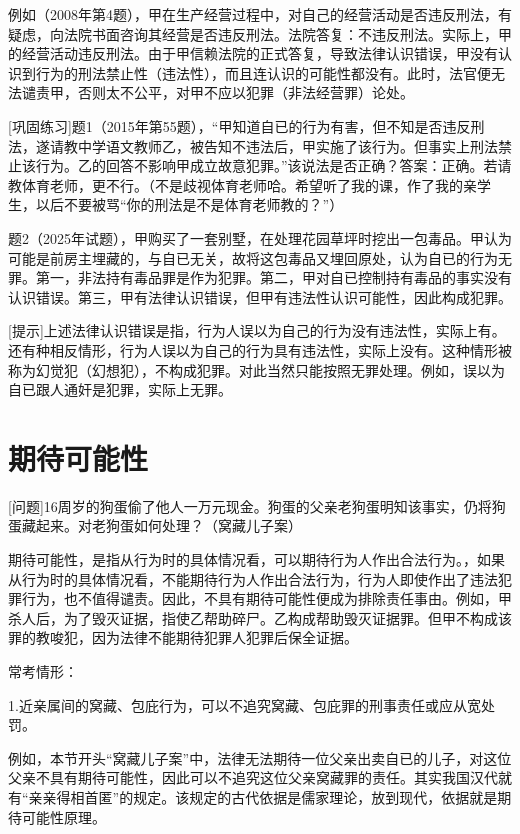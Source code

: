 例如（2008年第4题），甲在生产经营过程中，对自己的经营活动是否违反刑法，有疑虑，向法院书面咨询其经营是否违反刑法。法院答复：不违反刑法。实际上，甲的经营活动违反刑法。由于甲信赖法院的正式答复，导致法律认识错误，甲没有认识到行为的刑法禁止性（违法性），而且连认识的可能性都没有。此时，法官便无法谴责甲，否则太不公平，对甲不应以犯罪（非法经营罪）论处。

[巩固练习]题1（2015年第55题），“甲知道自已的行为有害，但不知是否违反刑法，遂请教中学语文教师乙，被告知不违法后，甲实施了该行为。但事实上刑法禁止该行为。乙的回答不影响甲成立故意犯罪。”该说法是否正确？答案：正确。若请教体育老师，更不行。（不是歧视体育老师哈。希望听了我的课，作了我的亲学生，以后不要被骂“你的刑法是不是体育老师教的？”）

题2（2025年试题），甲购买了一套别墅，在处理花园草坪时挖出一包毒品。甲认为可能是前房主埋藏的，与自已无关，故将这包毒品又埋回原处，认为自已的行为无罪。第一，非法持有毒品罪是作为犯罪。第二，甲对自已控制持有毒品的事实没有认识错误。第三，甲有法律认识错误，但甲有违法性认识可能性，因此构成犯罪。

[提示]上述法律认识错误是指，行为人误以为自己的行为没有违法性，实际上有。还有种相反情形，行为人误以为自己的行为具有违法性，实际上没有。这种情形被称为幻觉犯（幻想犯），不构成犯罪。对此当然只能按照无罪处理。例如，误以为自已跟人通奸是犯罪，实际上无罪。



\section{期待可能性}

[问题]16周岁的狗蛋偷了他人一万元现金。狗蛋的父亲老狗蛋明知该事实，仍将狗蛋藏起来。对老狗蛋如何处理？（窝藏儿子案）

期待可能性，是指从行为时的具体情况看，可以期待行为人作出合法行为。，如果从行为时的具体情况看，不能期待行为人作出合法行为，行为人即使作出了违法犯罪行为，也不值得谴责。因此，不具有期待可能性便成为排除责任事由。例如，甲杀人后，为了毁灭证据，指使乙帮助碎尸。乙构成帮助毁灭证据罪。但甲不构成该罪的教唆犯，因为法律不能期待犯罪人犯罪后保全证据。

常考情形：

1.近亲属间的窝藏、包庇行为，可以不追究窝藏、包庇罪的刑事责任或应从宽处罚。

例如，本节开头“窝藏儿子案”中，法律无法期待一位父亲出卖自已的儿子，对这位父亲不具有期待可能性，因此可以不追究这位父亲窝藏罪的责任。其实我国汉代就有“亲亲得相首匿”的规定。该规定的古代依据是儒家理论，放到现代，依据就是期待可能性原理。

